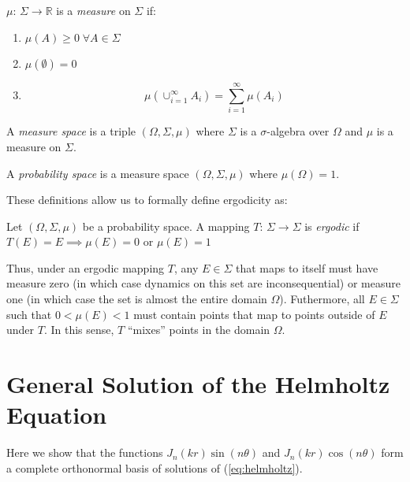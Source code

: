 \documentclass{report}
\begin{document}
\begin{dfn}[Measure]
$\mu$: $\Sigma \rightarrow \mathbb{R}$ is a \emph{measure} on $\Sigma$ if:
\begin{enumerate}
\item
$\mu(A) \ge 0 \; \forall A \in \Sigma$
\item
$\mu(\emptyset) = 0$
\item
\[
\mu\left(\cup_{i=1}^{\infty} A_{i} \right) = \sum_{i=1}^{\infty} \mu(A_{i})
\]
\end{enumerate}
\end{dfn}

\begin{dfn}
A \emph{measure space} is a triple $(\Omega, \Sigma, \mu)$ where $\Sigma$ is a $\sigma$-algebra over $\Omega$ and $\mu$ is a measure on $\Sigma$.
\end{dfn}

\begin{dfn}
A \emph{probability space} is a measure space $(\Omega, \Sigma, \mu)$ where $\mu(\Omega) = 1$.
\end{dfn}

These definitions allow us to formally define ergodicity as:

\begin{dfn}[Ergodicity]
Let $(\Omega, \Sigma, \mu)$ be a probability space. A mapping $T$: $\Sigma \rightarrow \Sigma$ is \emph{ergodic} if $T(E) = E \implies \mu(E) = 0$ or $\mu(E) = 1$
\end{dfn}

Thus, under an ergodic mapping $T$, any $E \in \Sigma$ that maps to itself must have measure zero (in which case dynamics on this set are inconsequential) or measure one (in which case the set is almost the entire domain $\Omega$). Futhermore, all $E \in \Sigma$ such that $0 < \mu(E) < 1$ must contain points that map to points outside of $E$ under $T$. In this sense, $T$ ``mixes'' points in the domain $\Omega$.

\chapter{General Solution of the Helmholtz Equation}
\label{sec:helmholtz_basis}
Here we show that the functions $J_{n}(k r) \sin(n \theta)$ and $J_{n}(k r) \cos(n \theta)$ form a complete orthonormal basis of solutions of (\ref{eq:helmholtz}).
\end{document}
